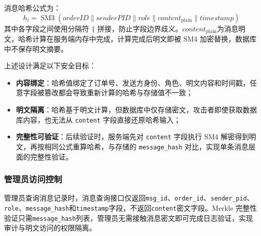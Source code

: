 消息哈希公式为：
\[
  h_i = \operatorname{SM3}(\mathit{orderID} \| \mathit{senderPID} \| \mathit{role} \| \mathit{content}_{\mathrm{plain}} \| \mathit{timestamp})
\]
其中各字段之间使用分隔符 \texttt{|} 拼接，防止字段边界歧义。$\mathit{content}_{\mathrm{plain}}$为消息明文，哈希计算在服务端内存中完成，计算完成后明文即被 SM4 加密替换，数据库中不保存明文摘要。

上述设计满足以下安全目标：
\begin{itemize}[leftmargin=2em]
  \item \textbf{内容绑定}：哈希值绑定了订单号、发送方身份、角色、明文内容和时间戳，任意字段被篡改都会导致重新计算的哈希与存储值不一致；
  \item \textbf{明文隔离}：哈希基于明文计算，但数据库中仅存储密文，攻击者即使获取数据库内容，也无法从 \texttt{content} 字段直接还原哈希输入；
  \item \textbf{完整性可验证}：后续验证时，服务端先对 \texttt{content} 字段执行 SM4 解密得到明文，再按相同公式重算哈希，与存储的 \texttt{message\_hash} 对比，实现单条消息层面的完整性验证。
\end{itemize}

\subsubsection*{管理员访问控制}

管理员查询消息记录时，消息查询接口仅返回\texttt{msg\_id}、\texttt{order\_id}、\texttt{sender\_pid}、\texttt{role}、\texttt{message\_hash}和\texttt{timestamp}字段，不返回\texttt{content}密文字段。Merkle 完整性验证只需\texttt{message\_hash}列表，管理员无需接触消息密文即可完成日志验证，实现审计与明文访问的权限隔离。
